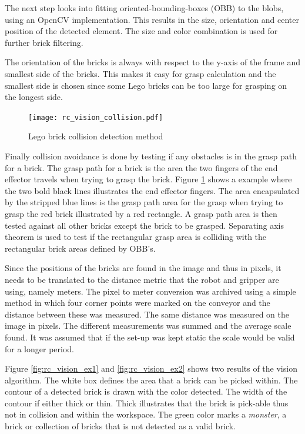 The next step looks into fitting oriented-bounding-boxes (OBB) to the blobs, using an OpenCV\cite{opencv} implementation. This results in the size, orientation and center position of the detected element. The size and color combination is used for further brick filtering.

The orientation of the bricks is always with respect to the y-axis of the frame and smallest side of the bricks. This makes it easy for grasp calculation and the smallest side is chosen since some Lego bricks can be too large for grasping on the longest side. 
	
	\begin{figure}[H]
		\centering
	    \texttt{[image: rc\_vision\_collision.pdf]}
	    \caption{Lego brick collision detection method}
		\label{fig:rc_vision_collision}
	\end{figure}
	
Finally collision avoidance is done by testing if any obstacles is in the grasp path for a brick. The grasp path for a brick is the area the two fingers of the end effector travels when trying to grasp the brick. Figure \ref{fig:rc_vision_collision} shows a example where the two bold black lines illustrates the end effector fingers. The area encapsulated by the stripped blue lines is the grasp path area for the grasp when trying to grasp the red brick illustrated by a red rectangle. A grasp path area is then tested against all other bricks except the brick to be grasped. Separating axis theorem\cite{Gottschalk:1996:OHS:237170.237244} is used to test if the rectangular grasp area is colliding with the rectangular brick areas defined by OBB's.

Since the positions of the bricks are found in the image and thus in pixels, it needs to be translated to the distance metric that the robot and gripper are using, namely meters. The pixel to meter conversion was archived using a simple method in which four corner points were marked on the conveyor and the distance between these was measured. The same distance was measured on the image in pixels. The different measurements was summed and the average scale found. It was assumed that if the set-up was kept static the scale would be valid for a longer period.

Figure \ref{fig:rc_vision_ex1} and \ref{fig:rc_vision_ex2} shows two results of the vision algorithm. The white box defines the area that a brick can be picked within. The contour of a detected brick is drawn with the color detected. The width of the contour if either thick or thin. Thick illustrates that the brick is pick-able thus not in collision and within the workspace. The green color marks a \textit{monster}, a brick or collection of bricks that is not detected as a valid brick. 

